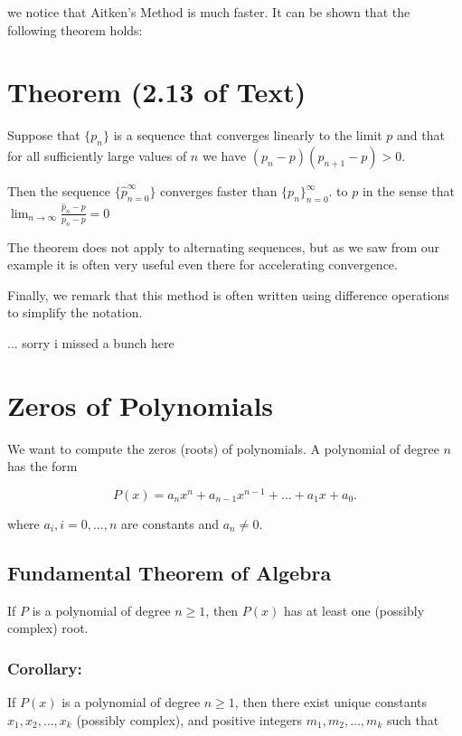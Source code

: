 \documentclass[12pt]{article}
\begin{document}
we notice that Aitken's Method is much faster.
It can be shown that the following theorem holds:

\section{Theorem (2.13 of Text)}

Suppose that $\{ p_n \}$ is a sequence that converges linearly to the limit $p$
and that for all sufficiently large values of $n$ we have $(p_n-p)(p_{n+1}-p) > 0$.

Then the sequence $\{ \hat{p}_{n=0}^\infty \}$ converges faster than $\{ p_n \}_{n=0}^\infty$.
to $p$ in the sense that $\displaystyle \lim_{n\to\infty} \frac{\hat{p}_n - p}{p_n-p} = 0$

The theorem does not apply to alternating sequences, but as we saw from our 
example it is often very useful even there for accelerating convergence.

Finally, we remark that this method is often written using difference operations 
to simplify the notation.

... sorry i missed a bunch here

\section{Zeros of Polynomials}

We want to compute the zeros (roots) of polynomials. A polynomial of degree $n$
has the form

\[
  P(x) = a_nx^n + a_{n-1}x^{n-1} + \dots + a_1x+a_0
.\]

where $a_i , i=0,\dots,n$ are constants and $a_n \neq 0$.

\subsection{Fundamental Theorem of Algebra}

If \( P \) is a polynomial of degree \( n \geq 1 \), then \( P(x) \) has at least one (possibly complex) root.

\subsubsection*{Corollary:}
If \( P(x) \) is a polynomial of degree \( n \geq 1 \), then there exist unique constants \( x_1, x_2, \dots, x_k \) (possibly complex), and positive integers \( m_1, m_2, \dots, m_k \) such that
\end{document}
